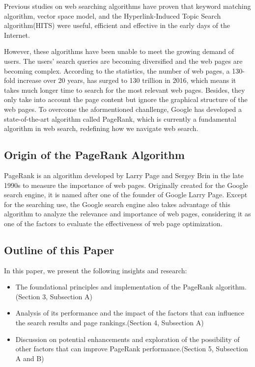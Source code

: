 \documentclass[lettersize,journal,12pt,conference]{IEEEtran}
\begin{document}
Previous studies on web searching algorithms have proven that keyword matching algorithm\cite{ref1}, vector space model\cite{ref2}, and the Hyperlink-Induced Topic Search algorithm(HITS)\cite{ref3} were useful, efficient and effective in the early days of the Internet.

However, these algorithms have been unable to meet the growing demand of users. The users' search queries are becoming diversified and the web pages are becoming complex.
According to the statistics, the number of web pages, a 130-fold increase over 20 years, has surged to 130 trillion in 2016, which means it takes much longer time to search for the most relevant web pages.
Besides, they only take into account the page content but ignore the graphical structure of the web pages.
To overcome the aformentioned chanllenge, Google has developed a state-of-the-art algorithm called PageRank, which is currently a fundamental algorithm in web search, redefining how we navigate web search.

\subsection{Origin of the PageRank Algorithm}

PageRank is an algorithm developed by Larry Page and Sergey Brin in the late 1990s to measure the importance of web pages\cite{ref0}.
Originally created for the Google search engine, it is named after one of the founder of Google Larry Page. Except for the searching use, the Google search engine also takes advantage of this algorithm to analyze the relevance and importance of web pages, considering it as one of the factors to evaluate the effectiveness of web page optimization.

\subsection{Outline of this Paper}

In this paper, we present the following insights and research:
\begin{itemize}
	\item The foundational principles and implementation of the PageRank algorithm.(Section 3, Subsection A)
	\item Analysis of its performance and the impact of the factors that can influence the search results and page rankings.(Section 4, Subsection A)
	\item Discussion on potential enhancements and exploration of the possibility of other factors that can improve PageRank performance.(Section 5, Subsection A and B)
\end{itemize}
\end{document}
